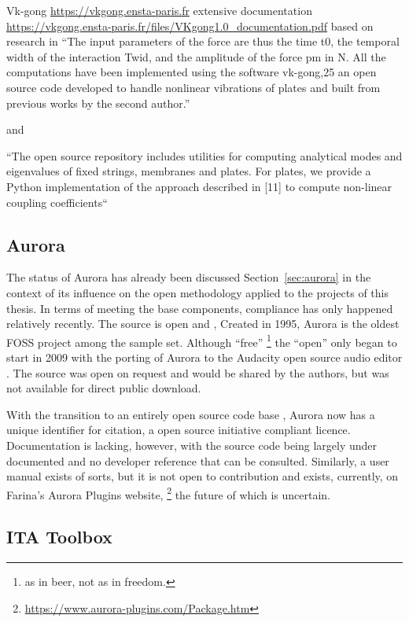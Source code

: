 Vk-gong \url{https://vkgong.ensta-paris.fr} extensive documentation \url{https://vkgong.ensta-paris.fr/files/VKgong1.0_documentation.pdf} based on research in \cite{ducceschi_simulations_2015}
\cite{nguyen_nonlinear_2019} ``The input parameters of the force are thus the time t0, the temporal width of the interaction Twid, and the amplitude of the force pm in N. All the computations have been implemented using the software vk-gong,25 an open source code developed to handle nonlinear vibrations of plates and built from previous works by the second author.''

and \cite{diaz_fast_2025}

``The open source repository includes utilities for computing analytical modes and eigenvalues of fixed strings, membranes and plates. For plates, we provide a Python implementation of the approach described in [11] to compute non-linear coupling coefficients``

\subsection{Aurora}

The status of Aurora has already been discussed Section~\ref{sec:aurora} in the context of its influence on the open methodology applied to the projects of this thesis. In terms of meeting the base components, compliance has only happened relatively recently. The source is open and
, \cite{farina_new_2009} Created in 1995, Aurora is the oldest FOSS project among the sample set. Although ``free''
\footnote{as in beer, not as in freedom.}
the ``open'' only began to start in 2009 with the porting of Aurora to the Audacity open source audio editor \cite{farina_new_2009}. The source was open on request and would be shared by the authors, but was not available for direct public download.

With the transition to an entirely open source code base \cite{farina_aurora_2025}, Aurora now has a unique identifier for citation, a open source initiative compliant licence. Documentation is lacking, however, with the source code being largely under documented and no developer reference that can be consulted. Similarly, a user manual exists of sorts, but it is not open to contribution and exists, currently, on Farina's Aurora Plugins website,
\footnote{\url{https://www.aurora-plugins.com/Package.htm}}
the future of which is uncertain.

\subsection{ITA Toolbox}

